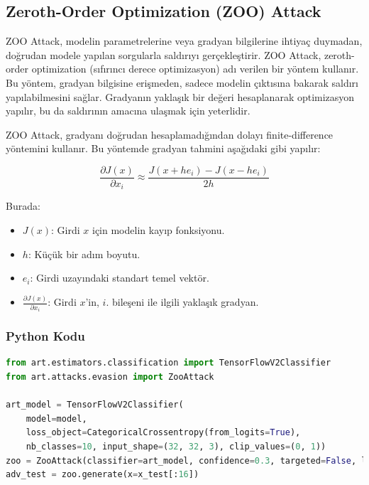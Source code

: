 \newpage

\subsection{Zeroth-Order Optimization (ZOO) Attack}

ZOO Attack, modelin parametrelerine veya gradyan bilgilerine ihtiyaç duymadan, doğrudan modele yapılan sorgularla saldırıyı gerçekleştirir. ZOO Attack, zeroth-order optimization (sıfırıncı derece optimizasyon) adı verilen bir yöntem kullanır. Bu yöntem, gradyan bilgisine erişmeden, sadece modelin çıktısına bakarak saldırı yapılabilmesini sağlar. Gradyanın yaklaşık bir değeri hesaplanarak optimizasyon yapılır, bu da saldırının amacına ulaşmak için yeterlidir.

ZOO Attack, gradyanı doğrudan hesaplamadığından dolayı finite-difference yöntemini kullanır. Bu yöntemde gradyan tahmini aşağıdaki gibi yapılır:

\[ \frac{\partial J(x)}{\partial x_i} \approx \frac{J(x + h e_i) - J(x - h e_i)}{2h} \]

Burada:

\begin{itemize}
    \item $J(x)$: Girdi $x$ için modelin kayıp fonksiyonu.
    \item $h$: Küçük bir adım boyutu.
    \item $e_i$: Girdi uzayındaki standart temel vektör.
    \item $\frac{\partial J(x)}{\partial x_i}$: Girdi $x$'in, $i$. bileşeni ile ilgili yaklaşık gradyan.
\end{itemize}

\subsubsection{Python Kodu}

\begin{lstlisting}[language=Python]
from art.estimators.classification import TensorFlowV2Classifier
from art.attacks.evasion import ZooAttack

art_model = TensorFlowV2Classifier(
    model=model, 
    loss_object=CategoricalCrossentropy(from_logits=True),
    nb_classes=10, input_shape=(32, 32, 3), clip_values=(0, 1))
zoo = ZooAttack(classifier=art_model, confidence=0.3, targeted=False, learning_rate=0.1)
adv_test = zoo.generate(x=x_test[:16])
\end{lstlisting}

\newpage
